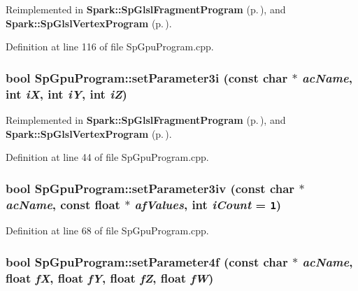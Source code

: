 Reimplemented in {\bf Spark::Sp\-Glsl\-Fragment\-Program} {\rm (p.\,\pageref{classSpark_1_1SpGlslFragmentProgram_a15})}, and {\bf Spark::Sp\-Glsl\-Vertex\-Program} {\rm (p.\,\pageref{classSpark_1_1SpGlslVertexProgram_a15})}.

Definition at line 116 of file Sp\-Gpu\-Program.cpp.
\subsubsection{\setlength{\rightskip}{0pt plus 5cm}bool Sp\-Gpu\-Program::set\-Parameter3i (const char $\ast$ {\em ac\-Name}, int {\em i\-X}, int {\em i\-Y}, int {\em i\-Z})\hspace{0.3cm}{\tt  [virtual]}}\label{classSpark_1_1SpGpuProgram_a14}




Reimplemented in {\bf Spark::Sp\-Glsl\-Fragment\-Program} {\rm (p.\,\pageref{classSpark_1_1SpGlslFragmentProgram_a3})}, and {\bf Spark::Sp\-Glsl\-Vertex\-Program} {\rm (p.\,\pageref{classSpark_1_1SpGlslVertexProgram_a3})}.

Definition at line 44 of file Sp\-Gpu\-Program.cpp.
\subsubsection{\setlength{\rightskip}{0pt plus 5cm}bool Sp\-Gpu\-Program::set\-Parameter3iv (const char $\ast$ {\em ac\-Name}, const float $\ast$ {\em af\-Values}, int {\em i\-Count} = {\tt 1})\hspace{0.3cm}{\tt  [virtual]}}\label{classSpark_1_1SpGpuProgram_a18}


Definition at line 68 of file Sp\-Gpu\-Program.cpp.
\subsubsection{\setlength{\rightskip}{0pt plus 5cm}bool Sp\-Gpu\-Program::set\-Parameter4f (const char $\ast$ {\em ac\-Name}, float {\em f\-X}, float {\em f\-Y}, float {\em f\-Z}, float {\em f\-W})\hspace{0.3cm}{\tt  [virtual]}}\label{classSpark_1_1SpGpuProgram_a23}




